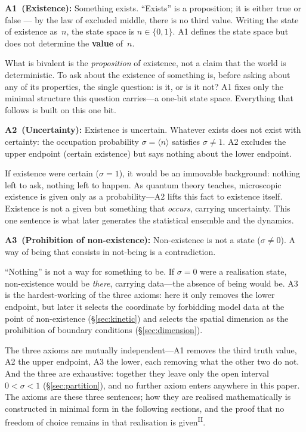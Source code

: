 \documentclass[12pt,a4paper]{article}
\newcommand{\PII}{\textsuperscript{\textup{II}}}
\begin{document}
\noindent\textbf{A1~(Existence):}\;
Something exists. ``Exists'' is a proposition; it is either true
or false --- by the law of excluded middle, there is no third value.
Writing the state of existence as~$n$, the state space is
$n \in \{0,1\}$. A1 defines the state space but does not
determine the \textbf{value} of~$n$.

What is bivalent is the \emph{proposition} of existence, not a claim that the world is deterministic. To ask about the existence of something is, before asking about any of its properties, the single question: is it, or is it not? A1 fixes only the minimal structure this question carries---a one-bit state space. Everything that follows is built on this one bit.

\medskip
\noindent\textbf{A2~(Uncertainty):}\;
Existence is uncertain. Whatever exists does not exist with
certainty: the occupation probability
$\sigma = \langle n \rangle$ satisfies $\sigma \neq 1$.
A2 excludes the upper endpoint (certain existence) but says nothing
about the lower endpoint.

If existence were certain ($\sigma = 1$), it would be an immovable background: nothing left to ask, nothing left to happen. As quantum theory teaches, microscopic existence is given only as a probability---A2 lifts this fact to existence itself. Existence is not a given but something that \emph{occurs}, carrying uncertainty. This one sentence is what later generates the statistical ensemble and the dynamics.

\medskip
\noindent\textbf{A3~(Prohibition of non-existence):}\;
Non-existence is not a state ($\sigma \neq 0$). A way of being
that consists in not-being is a contradiction.

``Nothing'' is not a way for something to be. If $\sigma = 0$ were a realisation state, non-existence would be \emph{there}, carrying data---the absence of being would be. A3 is the hardest-working of the three axioms: here it only removes the lower endpoint, but later it selects the coordinate by forbidding model data at the point of non-existence (\S\ref{sec:kinetic}) and selects the spatial dimension as the prohibition of boundary conditions (\S\ref{sec:dimension}).

The three axioms are mutually independent---A1 removes the third truth value, A2 the upper endpoint, A3 the lower, each removing what the other two do not. And the three are exhaustive: together they leave only the open interval $0 < \sigma < 1$ (\S\ref{sec:partition}), and no further axiom enters anywhere in this paper. The axioms are these three sentences; how they are realised mathematically is constructed in minimal form in the following sections, and the proof that no freedom of choice remains in that realisation is given\PII{}.
\end{document}

